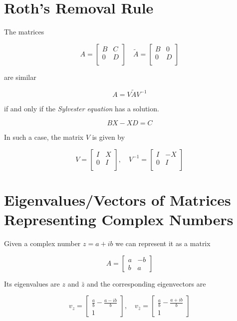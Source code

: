 \section{Roth's Removal Rule}

The matrices 

\[
    A = 
    \begin{bmatrix}
        B & C \\ 
        0 & D \\ 
    \end{bmatrix}
    \quad 
    \tilde{A} = 
    \begin{bmatrix}
        B & 0 \\ 
        0 & D \\ 
    \end{bmatrix}
\]

are similar 

\[
    A = V \tilde{A} V^{-1}
\]

if and only if the \emph{Sylvester equation} has a solution.

\[
    B X - X D = C
\]

In such a case, the matrix \(V\) is given by

\[
    V = 
    \begin{bmatrix}
        I & X \\ 
        0 & I \\ 
    \end{bmatrix},
    \quad
    V^{-1} =
    \begin{bmatrix}
        I & -X \\ 
        0 & I \\
    \end{bmatrix}
\]

\section{Eigenvalues/Vectors of Matrices Representing Complex Numbers}

Given a complex number \(z = a + ib\) we can represent it as a matrix

\[
    A = 
    \begin{bmatrix}
        a & -b \\
        b & a
    \end{bmatrix}
\]

Its eigenvalues are \(z\) and \(\bar{z}\) and the corresponding eigenvectors are

\[
    v_z = 
    \begin{bmatrix}
        \frac{a}{b} - \frac{a - ib}{b} \\
        1
    \end{bmatrix},
    \quad
    v_{\bar{z}} = \begin{bmatrix}
        \frac{a}{b} - \frac{a + ib}{b} \\
        1
    \end{bmatrix}
\]

